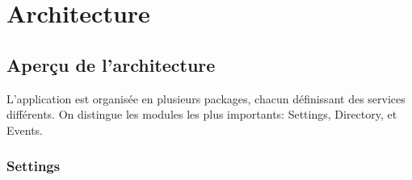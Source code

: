 \chapter{Architecture}
\section{Aperçu de l'architecture}

\begin{figure}[h]
  \label{fig:architecture}
  \center
  \setlength\fboxsep{5pt}
  \setlength\fboxrule{0.5pt}
\end{figure}

L'application est organisée en plusieurs packages, chacun définissant des services différents. On distingue les modules les plus importants: Settings, Directory, et Events.

\newpage
\subsection{Settings}

\begin{figure}[h!]
  \label{fig:preferences_mod}
  \center
  \setlength\fboxsep{5pt}
  \setlength\fboxrule{0.5pt}
\end{figure}

